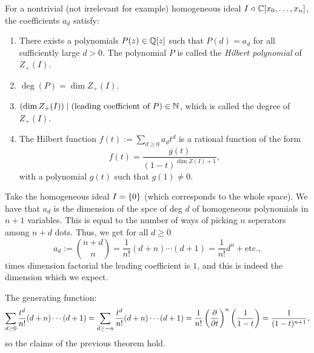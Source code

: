 \documentclass[11pt,a4paper]{article}
\begin{document}
\begin{theorem}
  For a nontrivial (not irrelevant for example)
  homogeneous ideal $I \triangleleft\, \mathbb{C}[x_0,\dots,x_n]$,
  the coefficients $a_d$ satisfy:
  \begin{enumerate}
    \item[(1)] There exists a polynomials $P(z) \in \mathbb{Q}[z]$ such that $P(d) = a_d$
      for all sufficiently large $d > 0$.
      The polynomial $P$ is called the \textit{Hilbert polynomial} of $Z_+(I)$.
    \item[(2)] $\deg(P) = \dim Z_+(I)$.
    \item[(3)] $(\dim Z_+(I)) \mid (\text{leading coefficient of } P) \in \mathbb{N}$,
      which is called the degree of $Z_+(I)$.
    \item[(4)] The Hilbert function $f(t) := \sum_{d \geq 0} a_d t^d$ is a rational
      function of the form
      \[
        f(t) = \frac{g(t)}{(1 - t)^{\dim Z(I) + 1}},
      \]
      with a polynomial $g(t)$ such that $g(1) \neq 0$.
  \end{enumerate}
\end{theorem}

\begin{example}
  Take the homogeneous ideal $I = \left\{0\right\}$ (which corresponds to the whole space).
  We have that $a_d$ is the dimension of the spce of deg $d$ of homogeneous
  polynomials in $n + 1$ variables.
  This is equal to the number of ways of picking $n$ seperators among $n + d$
  dots.
  Thus, we get for all $d \geq 0$
  \[
    a_d := \binom{n+d}{n} = \frac{1}{n!} (d + n) \cdots (d + 1) =
    \frac{1}{n!} d^n + \text{etc.},
  \]
  times dimension factorial the leading coefficient is $1$,
  and this is indeed the dimension which we expect.

  The generating function:
  \[
    \sum_{d \geq 0} \frac{t^d}{n!} (d + n) \cdots (d + 1) =
    \sum_{d \geq -n} \frac{t^d}{n!} (d + n) \cdots (d + 1) =
    \frac{1}{n!} \del{\frac{\partial}{\partial t}}^n \del{\frac{1}{1 - t}} =
    \frac{1}{(1 - t)^{n+1}},
  \]
  so the claims of the previous theorem hold.
\end{example}
\end{document}
